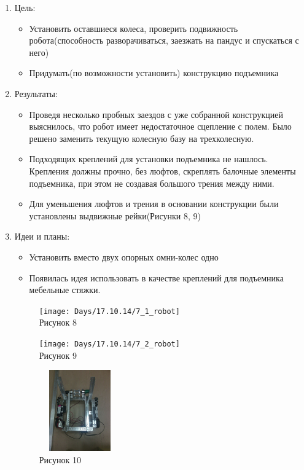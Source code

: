 
	\begin{enumerate}
	\item Цель:
		\begin{itemize}
		\item Установить оставшиеся колеса, проверить подвижность робота(способность разворачиваться, заезжать на пандус и спускаться с него)
		\item Придумать(по возможности установить) конструкцию подъемника
		\end{itemize}
	\item Результаты:
		\begin{itemize}
		\item Проведя несколько пробных заездов с уже собранной конструкцией выяснилось, что робот имеет недостаточное сцепление с полем. Было решено заменить текущую колесную базу на трехколесную.
		\item Подходящих креплений для установки подъемника не нашлось. Крепления должны прочно, без люфтов, скреплять балочные элементы подъемника, при этом не создавая большого трения между ними.
		\item Для уменьшения люфтов и трения в основании конструкции были установлены выдвижные рейки(Рисунки 8, 9)
		\end{itemize}
	\item Идеи и планы:
		\begin{itemize}
		\item Установить вместо двух опорных омни-колес одно
		\item Появилась идея использовать в качестве креплений для подъемника мебельные стяжки.
		\end{itemize}
	\begin{figure} [h]
			\centering
			\begin{minipage}{0.3\linewidth}
				\texttt{[image: Days/17.10.14/7\_1\_robot]}\\ Рисунок 8
			\end{minipage}
			\begin{minipage}{0.3\linewidth}
				\texttt{[image: Days/17.10.14/7\_2\_robot]}\\ Рисунок 9
			\end{minipage}
			\begin{minipage}{0.3\linewidth}
				\includegraphics[width=35mm,height=35mm]{Days/17.10.14/7_3_robot}\\ Рисунок 10
			\end{minipage}		
	\end{figure}
	\end{enumerate}
\newpage